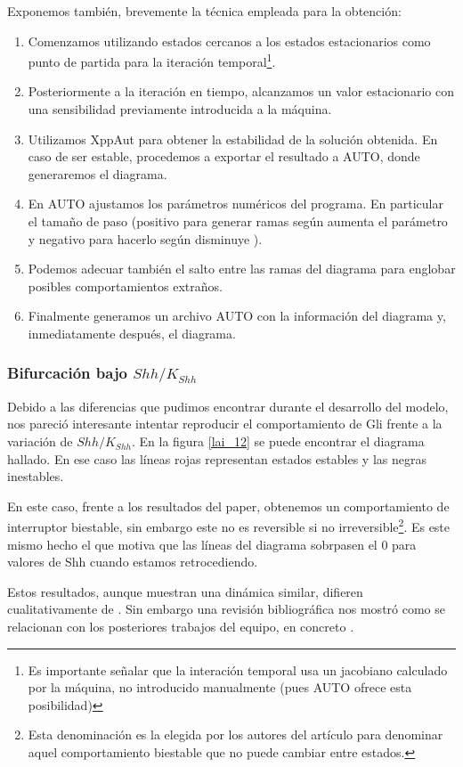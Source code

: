 Exponemos también, brevemente la técnica empleada para la obtención:
\begin{enumerate}
	\item Comenzamos utilizando estados cercanos a los estados estacionarios como punto de partida para la iteración temporal\footnote{Es importante señalar que la interación temporal usa un jacobiano calculado por la máquina, no introducido manualmente (pues AUTO ofrece esta posibilidad)}.
	\item Posteriormente a la iteración en tiempo, alcanzamos un valor estacionario con una sensibilidad previamente introducida a la máquina.
	\item Utilizamos XppAut para obtener la estabilidad de la solución obtenida. En caso de ser estable, procedemos a exportar el resultado a AUTO, donde generaremos el diagrama.
	\item En AUTO ajustamos los parámetros numéricos del programa. En particular el tamaño de paso (positivo para generar ramas según aumenta el parámetro y negativo para hacerlo según disminuye ).
	\item Podemos adecuar también el salto entre las ramas del diagrama para englobar posibles comportamientos extraños.
	\item Finalmente generamos un archivo AUTO con la información del diagrama y, inmediatamente después, el diagrama. 
\end{enumerate} 

\subsubsection{Bifurcación bajo $Shh/K_{Shh}$}
Debido a las diferencias que pudimos encontrar durante el desarrollo del modelo, nos pareció interesante intentar reproducir el comportamiento de Gli frente a la variación de $Shh/K_{Shh}$.  En la figura \ref{lai_12} se puede encontrar el diagrama hallado. En ese caso las líneas rojas representan estados estables y las negras inestables. 

En este caso, frente a los resultados del paper, obtenemos un comportamiento de interruptor biestable, sin embargo este no es reversible si no irreversible\footnote{Esta denominación es la elegida por los autores del artículo para denominar aquel comportamiento biestable que no puede cambiar entre estados.}. Es este mismo hecho el que motiva que las líneas del diagrama sobrpasen el 0 para valores de Shh cuando estamos retrocediendo.

Estos resultados, aunque muestran una dinámica similar, difieren cualitativamente de \cite{schaffer}. Sin embargo una revisión bibliográfica nos mostró como se relacionan con los posteriores trabajos del equipo, en concreto \cite{saha}. 

